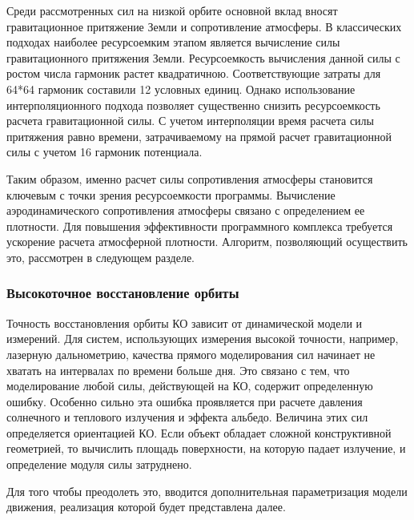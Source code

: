 Среди рассмотренных сил на низкой орбите основной вклад вносят гравитационное притяжение Земли 
и сопротивление атмосферы.
В классических подходах наиболее ресурсоемким этапом является вычисление силы гравитационного 
притяжения Земли. Ресурсоемкость вычисления данной силы с ростом числа гармоник растет квадратичною.
Соответствующие затраты для 64*64 гармоник составили 12 условных единиц.
Однако использование интерполяционного подхода \cite{kuznetsov2023} позволяет существенно 
снизить ресурсоемкость расчета гравитационной силы. С учетом интерполяции время
расчета силы притяжения равно времени, затрачиваемому на прямой расчет гравитационной силы
с учетом 16 гармоник потенциала. 

Таким образом, именно расчет силы 
сопротивления атмосферы становится ключевым с точки зрения ресурсоемкости программы.
Вычисление аэродинамического сопротивления атмосферы связано 
с определением ее плотности.
Для повышения эффективности программного комплекса требуется ускорение расчета атмосферной плотности.
Алгоритм, позволяющий осуществить это, рассмотрен в следующем разделе.

\subsubsection{Высокоточное восстановление орбиты}
Точность восстановления орбиты КО зависит от динамической модели и измерений.
Для систем, использующих измерения высокой точности, например, лазерную дальнометрию,
качества прямого моделирования сил начинает не хватать на интервалах по времени
больше дня. Это связано с тем, что моделирование
любой силы, действующей на КО, содержит определенную ошибку. Особенно сильно эта ошибка
проявляется при расчете давления солнечного и теплового излучения и эффекта альбедо. 
Величина этих сил определяется ориентацией КО. Если объект обладает сложной конструктивной геометрией,
то вычислить площадь поверхности, на которую падает излучение, и определение модуля силы затруднено. 

Для того чтобы преодолеть это, вводится дополнительная параметризация модели движения,
реализация которой будет представлена далее.